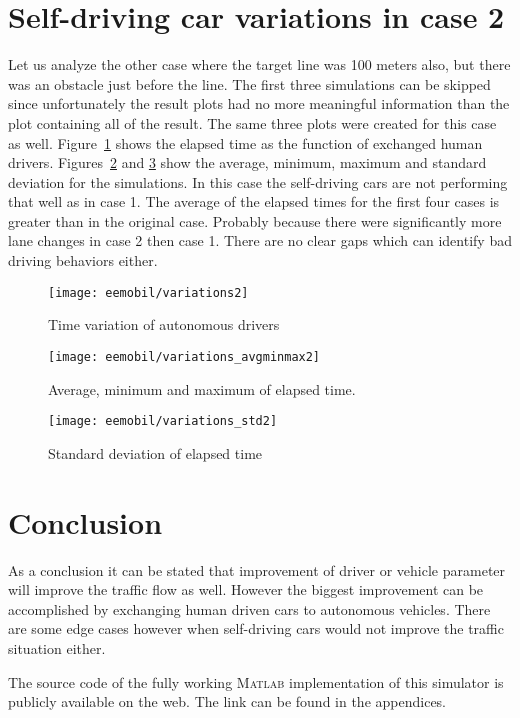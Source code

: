 	\section{Self-driving car variations in case 2}
		Let us analyze the other case where the target line was 100 meters also, but there was an obstacle just before the line. The first three simulations can be skipped since unfortunately the result plots had no more meaningful information than the plot containing all of the result. The same three plots were created for this case as well. Figure~\ref{fig:self_variations2} shows the elapsed time as the function of exchanged human drivers. Figures~\ref{fig:self_variations_avgminmax2} and \ref{fig:self_variations_std2} show the average, minimum, maximum and standard deviation for the simulations. In this case the self-driving cars are not performing that well as in case 1. The average of the elapsed times for the first four cases is greater than in the original case. Probably because there were significantly more lane changes in case 2 then case 1. There are no clear gaps which can identify bad driving behaviors either.
		\begin{figure}
			\centering
			\texttt{[image: eemobil/variations2]}
			\caption{Time variation of autonomous drivers}
			\label{fig:self_variations2}
		\end{figure}
		\begin{figure}
			\centering
			\texttt{[image: eemobil/variations\_avgminmax2]}
			\caption{Average, minimum and maximum of elapsed time.}
			\label{fig:self_variations_avgminmax2}
		\end{figure}
		\begin{figure}
			\centering
			\texttt{[image: eemobil/variations\_std2]}
			\caption{Standard deviation of elapsed time}
			\label{fig:self_variations_std2}
		\end{figure}
	\section{Conclusion}
		As a conclusion it can be stated that improvement of driver or vehicle parameter will improve the traffic flow as well. However the biggest improvement can be accomplished by exchanging human driven cars to autonomous vehicles. There are some edge cases however when self-driving cars would not improve the traffic situation either.

		The source code of the fully working \textsc{Matlab} implementation of this simulator is publicly available on the web. The link can be found in the appendices.
